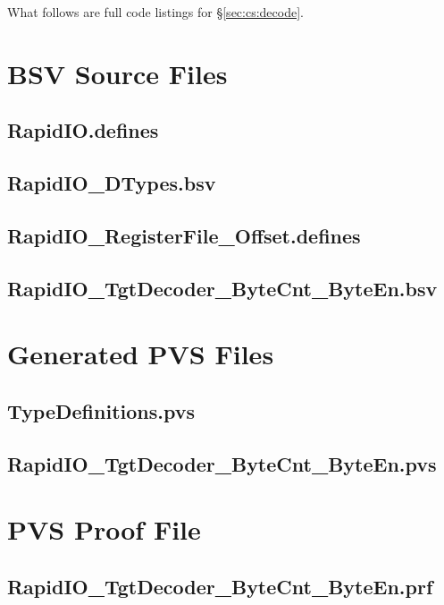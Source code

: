 What follows are full code listings for \S \ref{sec:cs:decode}.  

\section{BSV Source Files} \label{app:decode:bsv}
\subsection{RapidIO.defines} \label{app:decode:bsv:riodef}


\subsection{RapidIO\_DTypes.bsv} \label{app:decode:bsv:dtypes}


\subsection{RapidIO\_RegisterFile\_Offset.defines} \label{app:decode:bsv:bsv}


\subsection{RapidIO\_TgtDecoder\_ByteCnt\_ByteEn.bsv} \label{app:decode:bsv:bsv}


\section{Generated PVS Files} \label{app:decode:pvsgen}
\subsection{TypeDefinitions.pvs} \label{app:decode:pvsgen:tds}


\subsection{RapidIO\_TgtDecoder\_ByteCnt\_ByteEn.pvs} \label{app:decode:pvsgen:top}


\section{PVS Proof File} \label{app:decode:pvsprf}
\subsection{RapidIO\_TgtDecoder\_ByteCnt\_ByteEn.prf} \label{app:decode:pvsgen:prf:prf}
